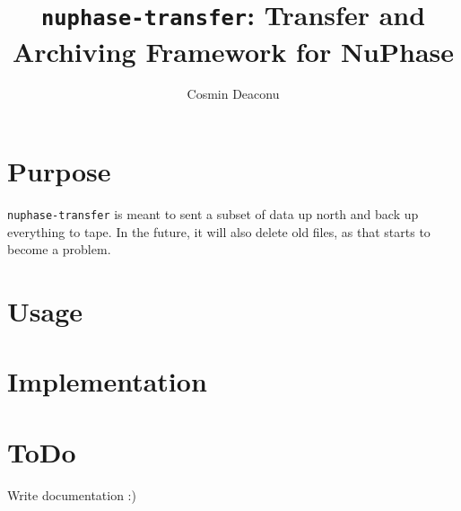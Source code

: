 \documentclass[12pt,letter]{article}
\title{\texttt{nuphase-transfer}: Transfer and Archiving Framework for NuPhase}
\author{Cosmin Deaconu}
\begin{document}
 
\maketitle 


\section{Purpose} 


\texttt{nuphase-transfer} is meant to sent a subset of data up north and back
up everything to tape. In the future, it will also delete old files, as that
starts to become a problem. 

\section{Usage} 

\section{Implementation} 

\section{ToDo} 

Write documentation :) 
\end{document}
